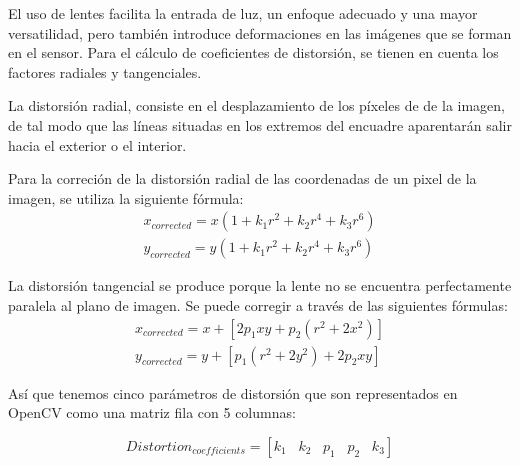 El uso de lentes facilita la entrada de luz, un enfoque adecuado y una mayor versatilidad, pero también introduce deformaciones en las imágenes que se forman en el sensor. Para el cálculo de coeficientes de distorsión, se tienen en cuenta los factores radiales y tangenciales. 

La distorsión radial, consiste en el desplazamiento de los píxeles de de la imagen, de tal modo que las líneas situadas en los extremos del encuadre aparentarán salir hacia el exterior o el interior.   

Para la correción de la distorsión radial de las coordenadas de un pixel de la imagen, se utiliza la siguiente fórmula:
\begin{equation}
  \begin{split}
    x_{corrected} = x(1 + k_1 r^2 + k_2 r^4 + k_3 r^6)  \\
    y_{corrected} = y(1 + k_1 r^2 + k_2 r^4 + k_3 r^6)
  \end{split}
\end{equation}

La distorsión tangencial se produce porque la lente no se encuentra perfectamente paralela al plano de imagen. Se puede corregir a través de las siguientes fórmulas:
\begin{equation}
  \begin{split}
    x_{corrected} = x + [ 2p_1xy + p_2(r^2+2x^2)] \\ 
    y_{corrected} = y + [ p_1(r^2+ 2y^2)+ 2p_2xy]
  \end{split}
\end{equation}

Así que tenemos cinco parámetros de distorsión que son representados en OpenCV como una matriz fila con 5 columnas: 

\begin{equation}
  Distortion_{coefficients} = [k_1 \hspace{10pt} k_2 \hspace{10pt} p_1 \hspace{10pt} p_2 \hspace{10pt} k_3]
\end{equation}



